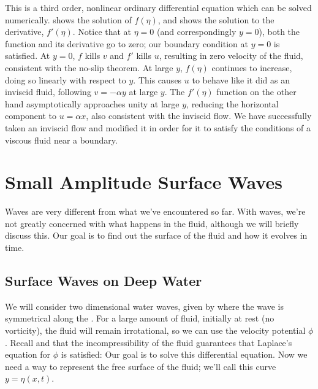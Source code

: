 \documentclass[12pt]{book}
\begin{document}
{

This is a third order, nonlinear ordinary differential equation which can be solved numerically.   shows the solution of $f(\eta)$, and  shows the solution to the derivative, $f'(\eta)$.   Notice that at $\eta=0$ (and correspondingly $y=0$), both the function and its derivative go to zero;  our boundary condition at $y=0$ is satisfied.  At $y=0$, $f$ kills $v$ and $f'$ kills $u$, resulting in zero velocity of the fluid, consistent with the no-slip theorem.   At large $y$, $f(\eta)$ continues to increase, doing so linearly with respect to $y$. This causes $u$ to behave like it did as an inviscid fluid, following $v=-\alpha y$ at large $y$.  The $f'(\eta)$ function on the other hand asymptotically approaches unity at large $y$, reducing the horizontal component to $u=\alpha x$, also consistent with the inviscid flow.  We have successfully taken an inviscid flow and modified it in order for it to satisfy the conditions of a viscous fluid near a boundary.


}
\stopAssignment
















\chapter{Small Amplitude Surface Waves}

Waves are very different from what we've encountered so far.  With waves, we're not greatly concerned with what happens in the fluid, although we will briefly discuss this. Our goal is to find out the surface of  the fluid and how it evolves in time.

\section{Surface Waves on Deep Water}

We will consider two dimensional  water waves, given by
where the wave is symmetrical along the \zaxis.  For a large amount of fluid, initially at rest (no vorticity), the fluid will remain irrotational, so we can use the velocity potential $\phi$. Recall
 and that the incompressibility of the fluid guarantees that Laplace's equation for $\phi$ is satisfied:
Our goal is to solve this differential equation.  Now we need a way to represent the free surface of the fluid; we'll call this curve \mbox{$y=\eta(x,t)$}.
\end{document}
